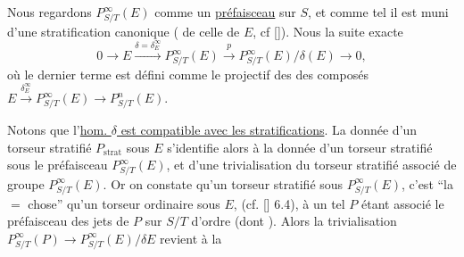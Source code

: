 
 Nous regardons $P^\infty_{S/T}(E)$ comme un \uline{préfaisceau} 
sur $S$, et comme tel il est muni d'une stratification
canonique ( de celle de $E$, cf [\quad]).
Nous  la  suite exacte
\[
0\longrightarrow E\xrightarrow{\delta=\delta_E^\infty}P^\infty_{S/T}(E)
\xrightarrow{p}P^\infty_{S/T}(E)/\delta(E)\longrightarrow0, \tag*{(25)}
\]
où le dernier terme est défini comme le  projectif des  des composés
$E\xrightarrow{\delta_E^\infty}P^\infty_{S/T}(E)\longrightarrow P^n_{S/T}(E)$.

 Notons que l'\uline{hom. $\delta$ est compatible avec les
stratifications}. La donnée d'un torseur stratifié $P_{\mathrm{strat}}$
sous $E$ s'identifie alors à la donnée d'un
torseur stratifié sous le préfaisceau $P^\infty_{S/T}(E)$, et
d'une trivialisation  du  torseur stratifié associé
de groupe $P^\infty_{S/T}(E)$. Or on constate qu'un torseur
stratifié sous $P^\infty_{S/T}(E)$, c'est ``la $=$ chose'' qu'un
torseur ordinaire  sous $E$, (cf. [\quad] 6.4), à un
tel $P$ étant associé le préfaisceau  des 
jets de $P$ sur $S/T$ d'ordre  (dont \unsure{$-$|$\infty$}). Alors
la trivialisation $P^\infty_{S/T}(P)\longrightarrow P^\infty_{S/T}(E)/\delta E$ revient à la
